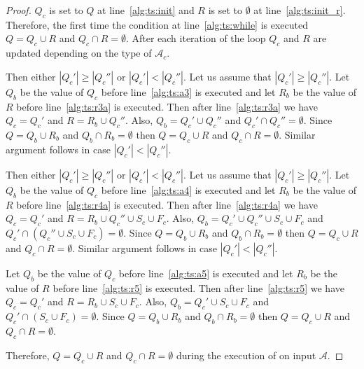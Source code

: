 \begin{proof}
  $Q_c$ is set to $Q$ at line~\ref{alg:ts:init} and $R$ is set to $\emptyset$ at
  line~\ref{alg:ts:init_r}.
  Therefore, the first time the condition at line~\ref{alg:ts:while} is executed $Q = Q_c \cup
    R$ and $Q_c \cap R = \emptyset$. After each iteration of the loop $Q_c$ and
  $R$ are updated depending on the type of $\mathcal{A}_c$.

  \begin{case}
    Then either $|Q_c'| \geq |Q_c''|$ or $|Q_c'| < |Q_c''|$. Let us
    assume that $|Q_c'| \geq |Q_c''|$. Let $Q_b$ be the value of $Q_c$
    before line~\ref{alg:ts:a3} is executed and let $R_b$ be the value of $R$ before
    line~\ref{alg:ts:r3a} is executed. Then after line~\ref{alg:ts:r3a} we have $Q_c = Q_c'$ and $R
      = R_b \cup Q_c''$. Also, $Q_b = Q_c' \cup Q_c''$ and $Q_c' \cap
      Q_c'' = \emptyset$. Since $Q = Q_b \cup R_b$ and $Q_b \cap R_b =
      \emptyset$ then $Q = Q_c \cup R$ and $Q_c \cap R = \emptyset$.
    Similar argument follows in case $|Q_c'| < |Q_c''|$.
  \end{case}

  \begin{case}
    Then either $|Q_c'| \geq |Q_c''|$ or $|Q_c'| < |Q_c''|$. Let us
    assume that $|Q_c'| \geq |Q_c''|$. Let $Q_b$ be the value of $Q_c$
    before line~\ref{alg:ts:a4} is executed and let $R_b$ be the value of $R$ before
    line~\ref{alg:ts:r4a} is executed. Then after line~\ref{alg:ts:r4a} we have $Q_c = Q_c'$ and $R
      = R_b \cup Q_c'' \cup S_c \cup F_c$. Also, $Q_b = Q_c' \cup Q_c''
      \cup S_c \cup F_c$ and $Q_c' \cap (Q_c'' \cup S_c \cup F_c) =
      \emptyset$. Since $Q = Q_b \cup R_b$ and $Q_b \cap R_b = \emptyset$
    then $Q = Q_c \cup R$ and $Q_c \cap R = \emptyset$. Similar argument
    follows in case $|Q_c'| < |Q_c''|$.
  \end{case}

  \begin{case}
    Let $Q_b$ be the value of $Q_c$ before line~\ref{alg:ts:a5} is executed and let
    $R_b$ be the value of $R$ before line~\ref{alg:ts:r5} is executed. Then after
    line~\ref{alg:ts:r5} we have $Q_c = Q_c'$ and $R = R_b \cup S_c \cup F_c$. Also,
    $Q_b = Q_c' \cup S_c \cup F_c$ and $Q_c' \cap (S_c \cup F_c) =
      \emptyset$. Since $Q = Q_b \cup R_b$ and $Q_b \cap R_b = \emptyset$
    then $Q = Q_c \cup R$ and $Q_c \cap R = \emptyset$.
  \end{case}

  \noindent
  Therefore, $Q = Q_c \cup R$ and $Q_c \cap R = \emptyset$ during the
  execution of  on input $\mathcal{A}$.
\end{proof}

